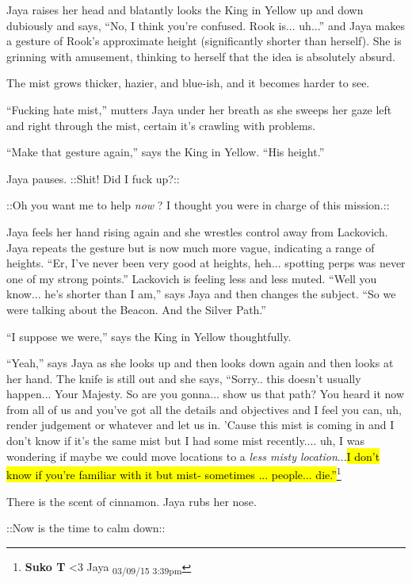 Jaya raises her head and blatantly looks the King in Yellow up and down dubiously and says, ``No, I think you're confused.  Rook is... uh...'' and Jaya makes a gesture of Rook's approximate height (significantly shorter than herself).  She is grinning with amusement, thinking to herself that the idea is absolutely absurd.

The mist grows thicker, hazier, and blue-ish, and it becomes harder to see.

``Fucking hate mist,'' mutters Jaya under her breath as she sweeps her gaze left and right through the mist, certain it's crawling with problems.

``Make that gesture again,'' says the King in Yellow.  ``His height.''

Jaya pauses.   {\color[RGB]{255,0,0}::Shit! Did I fuck up?::} 

 {\color[RGB]{74,134,232}::Oh you want me to help } \textit{ {\color[RGB]{74,134,232}now} } {\color[RGB]{74,134,232}?  I thought you were in charge of this mission.::} 

Jaya feels her hand rising again and she wrestles control away from Lackovich.  Jaya repeats the gesture but is now much more vague, indicating a range of heights.  ``Er, I've never been very good at heights, heh... spotting perps was never one of my strong points.''  Lackovich is feeling less and less muted.  ``Well you know... he's shorter than I am,'' says Jaya and then changes the subject. ``So we were talking about the Beacon.  And the Silver Path.''

``I suppose we were,'' says the King in Yellow thoughtfully.

``Yeah,'' says Jaya as she looks up and then looks down again and then looks at her hand.  The knife is still out and she says, ``Sorry.. this doesn't usually happen...  Your Majesty.  So are you gonna... show us that path?  You heard it now from all of us and you've got all the details and objectives and I feel you can, uh, render judgement or whatever and let us in.  'Cause this mist is coming in and I don't know if it's the same mist but I had some mist recently.... uh, I was wondering if maybe we could move locations to a \textit{less misty location}...\hl{I don't know if you're familiar with it but mist- sometimes ... people... die.''}\footnote{\textbf{Suko T }\textless 3 Jaya \textsubscript{03/09/15 3:39pm}}

There is the scent of cinnamon.  Jaya rubs her nose.

 {\color[RGB]{74,134,232}::Now is the time to calm down::} 

